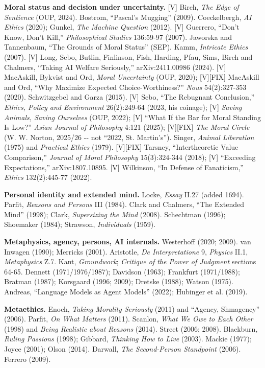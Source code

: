 \documentclass[11pt]{article}
\begin{document}
\textbf{Moral status and decision under uncertainty.} [V] Birch, \emph{The Edge of Sentience} (OUP, 2024). Bostrom, ``Pascal's Mugging'' (2009). Coeckelbergh, \emph{AI Ethics} (2020); Gunkel, \emph{The Machine Question} (2012). [V] Guerrero, ``Don't Know, Don't Kill,'' \emph{Philosophical Studies} 136:59-97 (2007). Jaworska and Tannenbaum, ``The Grounds of Moral Status'' (SEP). Kamm, \emph{Intricate Ethics} (2007). [V] Long, Sebo, Butlin, Finlinson, Fish, Harding, Pfau, Sims, Birch and Chalmers, ``Taking AI Welfare Seriously,'' arXiv:2411.00986 (2024). [V] MacAskill, Bykvist and Ord, \emph{Moral Uncertainty} (OUP, 2020); [V][FIX] MacAskill and Ord, ``Why Maximize Expected Choice-Worthiness?'' \emph{Nous} 54(2):327-353 (2020). Schwitzgebel and Garza (2015). [V] Sebo, ``The Rebugnant Conclusion,'' \emph{Ethics, Policy and Environment} 26(2):249-64 (2023, his coinage); [V] \emph{Saving Animals, Saving Ourselves} (OUP, 2022); [V] ``What If the Bar for Moral Standing Is Low?'' \emph{Asian Journal of Philosophy} 4:121 (2025); [V][FIX] \emph{The Moral Circle} (W. W. Norton, 2025/\allowbreak{}26 -{}- not ``2022, St. Martin's''). Singer, \emph{Animal Liberation} (1975) and \emph{Practical Ethics} (1979). [V][FIX] Tarsney, ``Intertheoretic Value Comparison,'' \emph{Journal of Moral Philosophy} 15(3):324-344 (2018); [V] ``Exceeding Expectations,'' arXiv:1807.10895. [V] Wilkinson, ``In Defense of Fanaticism,'' \emph{Ethics} 132(2):445-77 (2022).

\textbf{Personal identity and extended mind.} Locke, \emph{Essay} II.27 (added 1694). Parfit, \emph{Reasons and Persons} III (1984). Clark and Chalmers, ``The Extended Mind'' (1998); Clark, \emph{Supersizing the Mind} (2008). Schechtman (1996); Shoemaker (1984); Strawson, \emph{Individuals} (1959).

\textbf{Metaphysics, agency, persons, AI internals.} Westerhoff (2020; 2009). van Inwagen (1990); Merricks (2001). Aristotle, \emph{De Interpretatione} 9, \emph{Physics} II.1, \emph{Metaphysics} Z.7. Kant, \emph{Groundwork}; \emph{Critique of the Power of Judgment} sections 64-65. Dennett (1971/\allowbreak{}1976/\allowbreak{}1987); Davidson (1963); Frankfurt (1971/\allowbreak{}1988); Bratman (1987); Korsgaard (1996; 2009); Dretske (1988); Watson (1975). Andreas, ``Language Models as Agent Models'' (2022); Hubinger et al. (2019).

\textbf{Metaethics.} Enoch, \emph{Taking Morality Seriously} (2011) and ``Agency, Shmagency'' (2006). Parfit, \emph{On What Matters} (2011). Scanlon, \emph{What We Owe to Each Other} (1998) and \emph{Being Realistic about Reasons} (2014). Street (2006; 2008). Blackburn, \emph{Ruling Passions} (1998); Gibbard, \emph{Thinking How to Live} (2003). Mackie (1977); Joyce (2001); Olson (2014). Darwall, \emph{The Second-Person Standpoint} (2006). Ferrero (2009).
\end{document}
